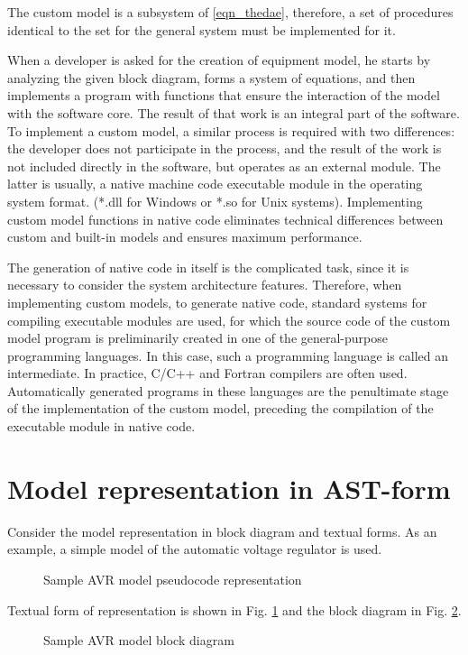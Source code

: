 \documentclass[lettersize,journal]{IEEEtran}
\begin{document}
The custom model is a subsystem of \eqref{eqn_thedae}, therefore, a set of procedures identical to the set for the general system must be implemented for it.

When a developer is asked for the creation of equipment model, he starts by analyzing the given block diagram, forms a system of equations, and then implements 
a program with functions that ensure the interaction of the model with the software core. The result of that work is an integral part of the software. 
To implement a custom model, a similar process is required with two differences: the developer does not participate in the process, and the result of the work 
is not included directly in the software, but operates as an external module. The latter is usually, a native machine code executable module in the operating system format.
(*.dll for Windows or *.so for Unix systems). Implementing custom model functions in native code eliminates technical differences between custom and 
built-in models and ensures maximum performance.

The generation of native code in itself is the complicated task, since it is necessary to consider the system architecture features.
Therefore, when implementing custom models, to generate native code, standard systems for compiling executable modules are used, 
for which the source code of the custom model program is preliminarily created in one of the general-purpose programming languages. 
In this case, such a programming language is called an intermediate. In practice, C/C++ and Fortran compilers are often used. 
Automatically generated programs in these languages are the penultimate stage of the implementation of the custom model, 
preceding the compilation of the executable module in native code.

\section{Model representation in AST-form}
Consider the model representation in block diagram and textual forms. As an example, a simple model of the automatic voltage regulator is used. 
\begin{figure}[h]
	\centering
	\caption{Sample AVR model pseudocode representation}
	\label{fig_avrcode}
\end{figure}
Textual form of representation is shown in Fig. \ref{fig_avrcode} and the block diagram in Fig. \ref{fig_avr}.
\begin{figure}[h]
	\centering
	\caption{Sample AVR model block diagram}
	\label{fig_avr}
\end{figure}
\end{document}

